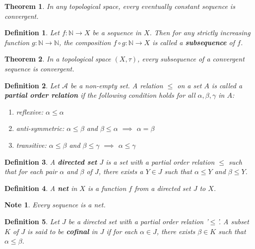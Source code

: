 \documentclass[14pt,twoside]{extreport}
\theoremstyle{dotless}
\newtheorem*{defn}{Definition}
\newtheorem*{thm}{Theorem} %
\newtheorem*{note}{Note} %
\begin{document}
\begin{thm}
    In any topological space, every eventually constant sequence is convergent.
\end{thm}

\begin{defn}
    Let $f \colon \mathbb{N} \to X$ be a sequence in $X$. Then for any strictly increasing function $g \colon \mathbb{N} \to \mathbb{N}$, the composition $f \circ g \colon \mathbb{N} \to X$ is called a \textbf{subsequence} of $f$.
\end{defn}

\begin{thm}
    In a topological space $\left (X, \tau\right )$, every subsequence of a convergent sequence is convergent.
\end{thm}

\begin{defn}
    Let $\mathcal{A}$ be a non-empty set. A relation $\leq$ on a set $A$ is called a \textbf{partial order relation} if the following condition holds for all $\alpha, \beta, \gamma$ in $A$:
    \begin{enumerate}
        \item reflexive: $\alpha \leq \alpha$
        \item anti-symmetric: $\alpha \leq \beta$ and $\beta \leq \alpha$ $\implies$ $\alpha = \beta$
        \item transitive: $\alpha \leq \beta$ and $\beta \leq \gamma$ $\implies$ $\alpha \leq \gamma$
    \end{enumerate}
\end{defn}

\begin{defn}
    A \textbf{directed set} $J$ is a set with a partial order relation $\leq$ such that for each pair $\alpha$ and $\beta$ of $J$, there exists a $Y \in J$ such that $\alpha \leq Y$ and $\beta \leq Y$.
\end{defn}

\begin{defn}
    A \textbf{net} in $X$ is a function $f$ from a directed set $J$ to $X$.
\end{defn}

\begin{note}
Every sequence is a net.
\end{note}

\begin{defn}
    Let $J$ be a directed set with a partial order relation '$\leq$'. A subset $K$ of $J$ is said to be \textbf{cofinal} in $J$ if for each $\alpha \in J$, there exists $\beta \in K$ such that $\alpha \leq \beta$.
\end{defn}
\end{document}
